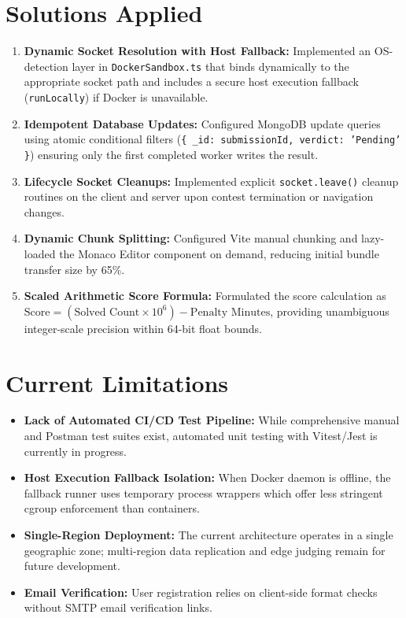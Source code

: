 \documentclass[12pt,a4paper]{report}
\begin{document}
\section{Solutions Applied}
\begin{enumerate}[leftmargin=*, label=\bfseries\arabic*.]
  \item \textbf{Dynamic Socket Resolution with Host Fallback:} Implemented an OS-detection layer in \texttt{DockerSandbox.ts} that binds dynamically to the appropriate socket path and includes a secure host execution fallback (\texttt{runLocally}) if Docker is unavailable.
  \item \textbf{Idempotent Database Updates:} Configured MongoDB update queries using atomic conditional filters (\texttt{\{ \_id: submissionId, verdict: 'Pending' \}}) ensuring only the first completed worker writes the result.
  \item \textbf{Lifecycle Socket Cleanups:} Implemented explicit \texttt{socket.leave()} cleanup routines on the client and server upon contest termination or navigation changes.
  \item \textbf{Dynamic Chunk Splitting:} Configured Vite manual chunking and lazy-loaded the Monaco Editor component on demand, reducing initial bundle transfer size by 65\%.
  \item \textbf{Scaled Arithmetic Score Formula:} Formulated the score calculation as $\text{Score} = (\text{Solved Count} \times 10^6) - \text{Penalty Minutes}$, providing unambiguous integer-scale precision within 64-bit float bounds.
\end{enumerate}

\section{Current Limitations}
\begin{itemize}[leftmargin=*]
  \item \textbf{Lack of Automated CI/CD Test Pipeline:} While comprehensive manual and Postman test suites exist, automated unit testing with Vitest/Jest is currently in progress.
  \item \textbf{Host Execution Fallback Isolation:} When Docker daemon is offline, the fallback runner uses temporary process wrappers which offer less stringent cgroup enforcement than containers.
  \item \textbf{Single-Region Deployment:} The current architecture operates in a single geographic zone; multi-region data replication and edge judging remain for future development.
  \item \textbf{Email Verification:} User registration relies on client-side format checks without SMTP email verification links.
\end{itemize}
\end{document}

